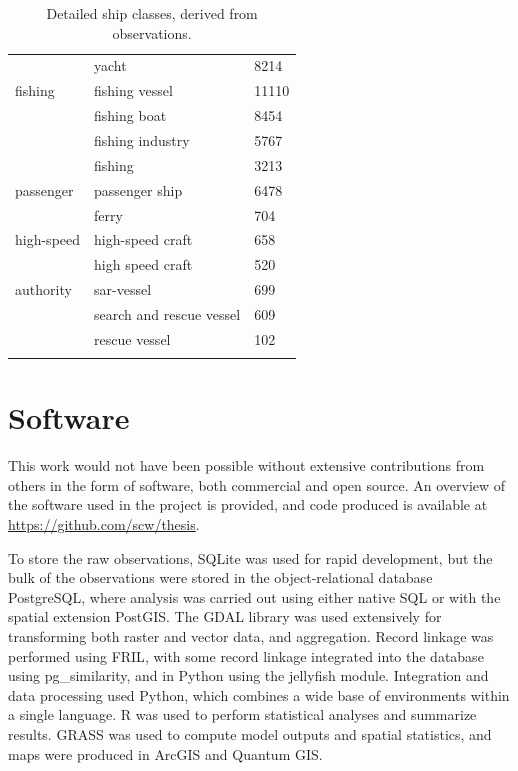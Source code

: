 \begin{longtable}{l|l|l}
           & yacht & 8214 \\
  fishing & fishing vessel & 11110 \\
          & fishing boat & 8454 \\
          & fishing industry & 5767 \\
          & fishing & 3213 \\
  passenger & passenger ship & 6478 \\
            & ferry & 704 \\
  high-speed & high-speed craft & 658 \\
             & high speed craft & 520 \\
  authority & sar-vessel & 699 \\
            & search and rescue vessel & 609 \\
            & rescue vessel & 102 \\
  \caption[Detailed ship classes]{Detailed ship classes, derived from observations.}
  \label{table:ship-class-breakdown}
\end{longtable}

\chapter{Software}
\label{sec:software}


This work would not have been possible without extensive contributions from others in the form of software, both commercial and open source. An overview of the software used in the project is provided, and code produced is available at \url{https://github.com/scw/thesis}. 

To store the raw observations, \textsf{SQLite} was used for rapid development, but the bulk of the observations were stored in the object-relational database \textsf{PostgreSQL}, where analysis was carried out using either native SQL or with the spatial extension \textsf{PostGIS}. The \textsf{GDAL} library was used extensively for transforming both raster and vector data, and aggregation. Record linkage was performed using \textsf{FRIL}, with some record linkage integrated into the database using \textsf{pg\_similarity}, and in \textsf{Python} using the \textsf{jellyfish} module. Integration and data processing used \textsf{Python}, which combines a wide base of environments within a single language. \textsf{R} was used to perform statistical analyses and summarize results. \textsf{GRASS} was used to compute model outputs and spatial statistics, and maps were produced in \textsf{ArcGIS} and \textsf{Quantum GIS}.

